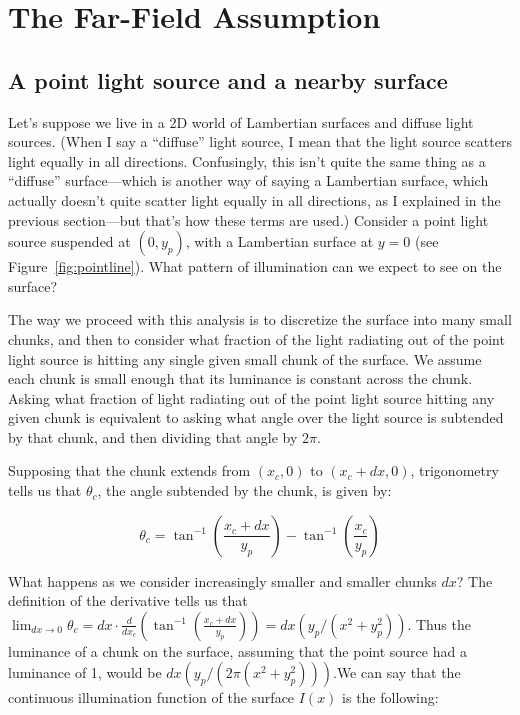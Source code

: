 \section{The Far-Field Assumption}

\subsection{A point light source and a nearby surface}

    Let's suppose we live in a 2D world of Lambertian surfaces and diffuse light sources. (When I say a ``diffuse'' light source, I mean that the light source scatters light equally in all directions. Confusingly, this isn't quite the same thing as a ``diffuse'' surface---which is another way of saying a Lambertian surface, which actually doesn't quite scatter light equally in all directions, as I explained in the previous section---but that's how these terms are used.) Consider a point light source suspended at $(0, y_p)$, with a Lambertian surface at $y=0$ (see Figure~\ref{fig:pointline}). What pattern of illumination can we expect to see on the surface?
    
    The way we proceed with this analysis is to discretize the surface into many small chunks, and then to consider what fraction of the light radiating out of the point light source is hitting any single given small chunk of the surface. We assume each chunk is small enough that its luminance is constant across the chunk. Asking what fraction of light radiating out of the point light source hitting any given  chunk is equivalent to asking what angle over the light source is subtended by that chunk, and then dividing that angle by $2\pi$. 
    
    Supposing that the chunk extends from $(x_c, 0)$ to $(x_c + dx, 0)$, trigonometry tells us that $\theta_c$, the angle subtended by the chunk, is given by:
    
$$\theta_c = \tan^{-1}(\frac{x_c+dx}{y_p}) - \tan^{-1}(\frac{x_c}{y_p})$$

    What happens as we consider increasingly smaller and smaller chunks $dx$? The definition of the derivative tells us that $\lim_{dx \rightarrow 0} \theta_c = dx \cdot \frac{d}{dx_c}(\tan^{-1}(\frac{x_c+dx}{y_p})) = dx (y_p/(x^2 + y_p^2))$. Thus the luminance of a chunk on the surface, assuming that the point source had a luminance of 1, would be $dx (y_p/(2\pi(x^2 + y_p^2)))$.\footnotemark We can say that the continuous illumination function of the surface $I(x)$ is the following:
    
